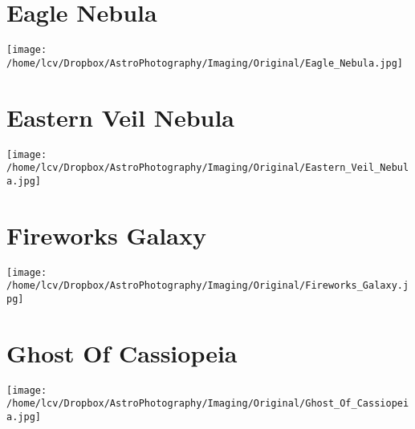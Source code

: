 \section{Eagle Nebula}
\texttt{[image: /home/lcv/Dropbox/AstroPhotography/Imaging/Original/Eagle\_Nebula.jpg]}
{\footnotesize\color{white}

}
\section{Eastern Veil Nebula}
\texttt{[image: /home/lcv/Dropbox/AstroPhotography/Imaging/Original/Eastern\_Veil\_Nebula.jpg]}
{\footnotesize\color{white}

}
\section{Fireworks Galaxy}
\texttt{[image: /home/lcv/Dropbox/AstroPhotography/Imaging/Original/Fireworks\_Galaxy.jpg]}
{\footnotesize\color{white}

}
\section{Ghost Of Cassiopeia}
\texttt{[image: /home/lcv/Dropbox/AstroPhotography/Imaging/Original/Ghost\_Of\_Cassiopeia.jpg]}
{\footnotesize\color{white}

}

